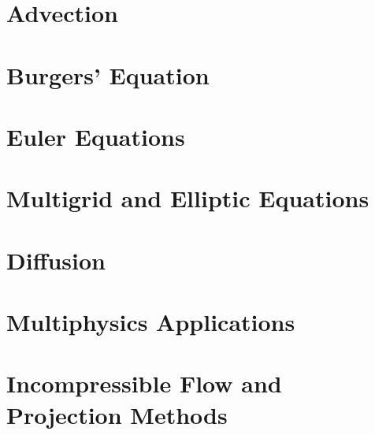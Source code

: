 \documentclass[11pt]{book}
\begin{document}
\chapter{Advection}



\chapter{Burgers' Equation}



\chapter{Euler Equations}





\chapter{Multigrid and Elliptic Equations}



\chapter{Diffusion}



\chapter{Multiphysics Applications}





\chapter{Incompressible Flow and Projection Methods}
\end{document}

